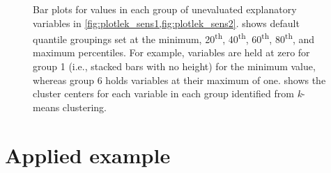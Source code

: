 \documentclass[article,shortnames]{jss}\usepackage[]{graphicx}\usepackage[]{color}
\begin{document}
\begin{figure}
\centering
{}

\caption{Bar plots for values in each group of unevaluated explanatory variables in \cref{fig:plotlek_sens1,fig:plotlek_sens2}.   shows default quantile groupings set at the minimum, 20\textsuperscript{th}, 40\textsuperscript{th}, 60\textsuperscript{th}, 80\textsuperscript{th}, and maximum percentiles.  For example, variables are held at zero for group 1 (i.e., stacked bars with no height) for the minimum value, whereas group 6 holds variables at their maximum of one.  shows the cluster centers for each variable in each group identified from {\it k}-means clustering.}
\label{fig:plotlek_bars}
\end{figure}

\section[Applied example]{Applied example}
\end{document}

